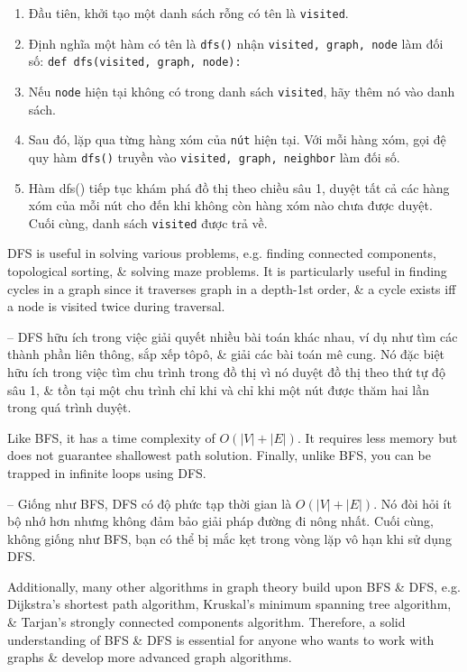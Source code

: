 \documentclass{article}
\begin{document}
\begin{itemize}
\begin{itemize}
\begin{itemize}
\begin{enumerate}
                \item Đầu tiên, khởi tạo một danh sách rỗng có tên là {\tt visited}.
                \item Định nghĩa một hàm có tên là {\tt dfs()} nhận {\tt visited, graph, node} làm đối số: {\tt def dfs(visited, graph, node):}
                \item Nếu {\tt node} hiện tại không có trong danh sách {\tt visited}, hãy thêm nó vào danh sách.
                \item Sau đó, lặp qua từng hàng xóm của {\tt nút} hiện tại. Với mỗi hàng xóm, gọi đệ quy hàm {\tt dfs()} truyền vào {\tt visited, graph, neighbor} làm đối số.
                \item Hàm {\sf dfs()} tiếp tục khám phá đồ thị theo chiều sâu 1, duyệt tất cả các hàng xóm của mỗi nút cho đến khi không còn hàng xóm nào chưa được duyệt. Cuối cùng, danh sách {\tt visited} được trả về.
            \end{enumerate}
            DFS is useful in solving various problems, e.g. finding connected components, topological sorting, \& solving maze problems. It is particularly useful in finding cycles in a graph since it traverses graph in a depth-1st order, \& a cycle exists iff a node is visited twice during traversal.

            -- DFS hữu ích trong việc giải quyết nhiều bài toán khác nhau, ví dụ như tìm các thành phần liên thông, sắp xếp tôpô, \& giải các bài toán mê cung. Nó đặc biệt hữu ích trong việc tìm chu trình trong đồ thị vì nó duyệt đồ thị theo thứ tự độ sâu 1, \& tồn tại một chu trình chỉ khi và chỉ khi một nút được thăm hai lần trong quá trình duyệt.

            Like BFS, it has a time complexity of $O(|V| + |E|)$. It requires less memory but does not guarantee shallowest path solution. Finally, unlike BFS, you can be trapped in infinite loops using DFS.

            -- Giống như BFS, DFS có độ phức tạp thời gian là $O(|V| + |E|)$. Nó đòi hỏi ít bộ nhớ hơn nhưng không đảm bảo giải pháp đường đi nông nhất. Cuối cùng, không giống như BFS, bạn có thể bị mắc kẹt trong vòng lặp vô hạn khi sử dụng DFS.

            Additionally, many other algorithms in graph theory build upon BFS \& DFS, e.g. Dijkstra's shortest path algorithm, Kruskal's minimum spanning tree algorithm, \& Tarjan's strongly connected components algorithm. Therefore, a solid understanding of BFS \& DFS is essential for anyone who wants to work with graphs \& develop more advanced graph algorithms.


\end{itemize}
\end{itemize}
\end{itemize}
\end{document}
